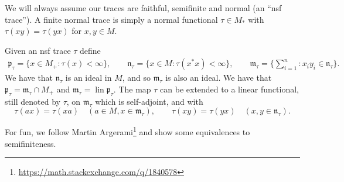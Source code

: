 \documentclass[a4paper,11pt]{article}
\newcommand{\mf}[1]{{\mathfrak{#1}}}
\newcommand{\lin}{{\operatorname{lin}}}
\theoremstyle{definition}
\begin{document}
We will always assume our traces are faithful, semifinite and normal (an ``nsf trace'').  A finite normal trace is simply a normal functional $\tau\in M_*$ with $\tau(xy) = \tau(yx)$ for $x,y\in M$.

Given an nsf trace $\tau$ define
\begin{gather*}
\mf p_\tau = \{ x\in M_+ : \tau(x)<\infty \}, \qquad
\mf n_\tau = \{ x\in M : \tau(x^*x)<\infty \}, \qquad
\mf m_\tau = \Big\{ \sum_{i=1}^n : x_i y_i \in \mf n_\tau \Big\}.
\end{gather*}
We have that $\mf n_\tau$ is an ideal in $M$, and so $\mf m_\tau$ is also an ideal.  We have that $\mf p_\tau = \mf m_\tau \cap M_+$ and $\mf m_\tau = \lin \mf p_\tau$.  The map $\tau$ can be extended to a linear functional, still denoted by $\tau$, on $\mf m_\tau$ which is self-adjoint, and with
\[ \tau(ax) = \tau(xa) \quad (a\in M, x\in \mf m_\tau), \qquad
\tau(xy)=\tau(yx) \quad (x,y\in\mf n_\tau). \]

For fun, we follow Martin Argerami\footnote{\url{https://math.stackexchange.com/q/1840578}} and show some equivalences to semifiniteness.
\end{document}
